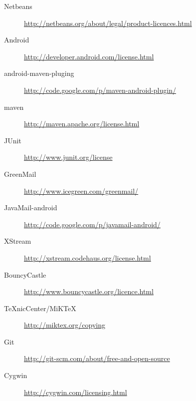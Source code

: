 	\begin{description}
		\item[Netbeans] \url{http://netbeans.org/about/legal/product-licences.html}
		\item[Android] \url{http://developer.android.com/license.html}
		\item[android-maven-pluging] \url{http://code.google.com/p/maven-android-plugin/}
		\item[maven] \url{http://maven.apache.org/license.html}
		\item[JUnit] \url{http://www.junit.org/license}
		\item[GreenMail] \url{http://www.icegreen.com/greenmail/}
		\item[JavaMail-android] \url{http://code.google.com/p/javamail-android/}
		\item[XStream] \url{http://xstream.codehaus.org/license.html}
		\item[BouncyCastle] \url{http://www.bouncycastle.org/licence.html}
		\item[TeXnicCenter/MiKTeX] \url{http://miktex.org/copying}
		\item[Git] \url{http://git-scm.com/about/free-and-open-source}
		\item[Cygwin] \url{http://cygwin.com/licensing.html}
	\end{description}